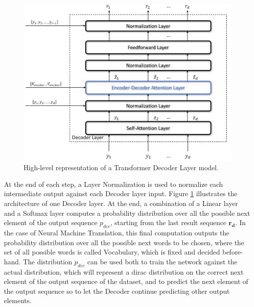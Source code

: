                 \begin{figure}[!t]
                    \centering
                    \includegraphics[width=15cm, keepaspectratio]{images/an/transformer_decoder.png}
                    \caption{High-level representation of a Transformer Decoder Layer model.}
                    \label{fig:an_transformer_decoder}
                \end{figure}
                \noindent
                At the end of each step, a Layer Normalization is used to normalize each intermediate output against each Decoder layer input. Figure \ref{fig:an_transformer_decoder} illustrates the architecture of one Decoder layer. \newline
                At the end, a combination of a Linear layer and a Softmax layer computes a probability distribution over all the possible next element of the output sequence $p_{dec}$, starting from the last result sequence $\mathbf{r_d}$. In the case of Neural Machine Translation, this final computation outputs the probability distribution over all the possible next words to be chosen, where the set of all possible words is called Vocabulary, which is fixed and decided before-hand. \newline
                The distribution $p_{dec}$ can be used both to train the network against the actual distribution, which will represent a dirac distribution on the correct next element of the output sequence of the dataset, and to predict the next element of the output sequence so to let the Decoder continue predicting other output elements.
                
